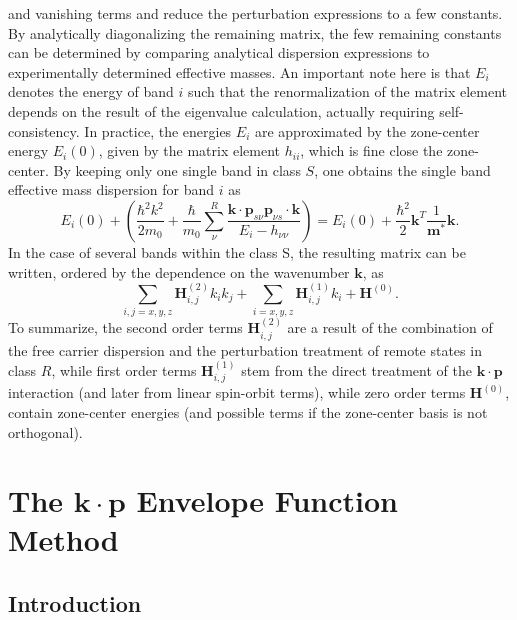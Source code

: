 and vanishing terms and reduce the perturbation expressions to a few
constants. By analytically diagonalizing the remaining matrix, the
few remaining constants can be determined by comparing analytical
dispersion expressions to experimentally determined effective masses.
An important note here is that $E_{i}$ denotes the energy of band
$i$ such that the renormalization of the matrix element depends on
the result of the eigenvalue calculation, actually requiring self-consistency.
In practice, the energies $E_{i}$ are approximated by the zone-center
energy $E_{i}(0)$, given by the matrix element $h_{ii}$, which is
fine close the zone-center. By keeping only one single band in class
$S$, one obtains the single band effective mass dispersion for band
$i$ as\begin{equation}
E_{i}(0)+\left(\frac{\hbar^{2}k^{2}}{2m_{0}}+\frac{\hbar}{m_{0}}\sum_{\nu}^{R}\frac{\mathbf{k}\cdot\mathbf{p}_{s\nu}\mathbf{p}_{\nu s}\cdot\mathbf{k}}{E_{i}-h_{\nu\nu}}\right)=E_{i}(0)+\frac{\hbar^{2}}{2}\mathbf{k}^{T}\frac{1}{\mathbf{m}^{*}}\mathbf{k}.\end{equation}
In the case of several bands within the class S, the resulting matrix
can be written, ordered by the dependence on the wavenumber $\mathbf{k}$,
as\begin{equation}
\sum_{i,j=x,y,z}\mathbf{H}_{i,j}^{(2)}k_{i}k_{j}+\sum_{i=x,y,z}\mathbf{H}_{i,j}^{(1)}k_{i}+\mathbf{H}^{(0)}.\end{equation}
To summarize, the second order terms $\mathbf{H}_{i,j}^{(2)}$ are
a result of the combination of the free carrier dispersion and the
perturbation treatment of remote states in class $R$, while first
order terms $\mathbf{H}_{i,j}^{(1)}$ stem from the direct treatment
of the $\mathbf{k}\cdot\mathbf{p}$ interaction (and later from linear
spin-orbit terms), while zero order terms $\mathbf{H}^{(0)}$, contain
zone-center energies (and possible terms if the zone-center basis
is not orthogonal).


\section{The $\mathbf{k}\cdot\mathbf{p}$ Envelope Function Method}


\subsection{Introduction}

